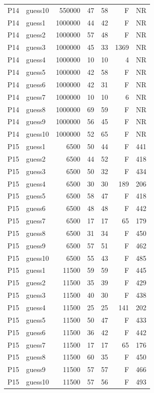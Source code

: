 {\begin{longtable}{llrrrrr}
P14 & guess10 & 550000 & 47 & 58 & F & NR \\
P14 & guess1 & 1000000 & 44 & 42 & F & NR \\
P14 & guess2 & 1000000 & 57 & 48 & F & NR \\
P14 & guess3 & 1000000 & 45 & 33 & 1369 & NR \\
P14 & guess4 & 1000000 & 10 & 10 & 4 & NR \\
P14 & guess5 & 1000000 & 42 & 58 & F & NR \\
P14 & guess6 & 1000000 & 42 & 31 & F & NR \\
P14 & guess7 & 1000000 & 10 & 10 & 6 & NR \\
P14 & guess8 & 1000000 & 69 & 59 & F & NR \\
P14 & guess9 & 1000000 & 56 & 45 & F & NR \\
P14 & guess10 & 1000000 & 52 & 65 & F & NR \\
P15 & guess1 & 6500 & 50 & 44 & F & 441 \\
P15 & guess2 & 6500 & 44 & 52 & F & 418 \\
P15 & guess3 & 6500 & 50 & 32 & F & 434 \\
P15 & guess4 & 6500 & 30 & 30 & 189 & 206 \\
P15 & guess5 & 6500 & 58 & 47 & F & 418 \\
P15 & guess6 & 6500 & 48 & 48 & F & 442 \\
P15 & guess7 & 6500 & 17 & 17 & 65 & 179 \\
P15 & guess8 & 6500 & 31 & 34 & F & 450 \\
P15 & guess9 & 6500 & 57 & 51 & F & 462 \\
P15 & guess10 & 6500 & 55 & 43 & F & 485 \\
P15 & guess1 & 11500 & 59 & 59 & F & 445 \\
P15 & guess2 & 11500 & 35 & 39 & F & 429 \\
P15 & guess3 & 11500 & 40 & 30 & F & 438 \\
P15 & guess4 & 11500 & 25 & 25 & 141 & 202 \\
P15 & guess5 & 11500 & 50 & 47 & F & 433 \\
P15 & guess6 & 11500 & 36 & 42 & F & 442 \\
P15 & guess7 & 11500 & 17 & 17 & 65 & 176 \\
P15 & guess8 & 11500 & 60 & 35 & F & 450 \\
P15 & guess9 & 11500 & 57 & 57 & F & 466 \\
P15 & guess10 & 11500 & 57 & 56 & F & 493 \\

\end{longtable}}
